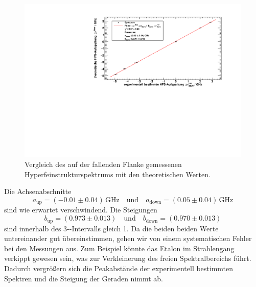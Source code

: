 \begin{figure}[H]
\begin{center}
    \includegraphics[width=\textwidth]{../img/part2/down-spectrum.pdf}
    \caption{Vergleich des auf der fallenden Flanke gemessenen Hyperfeinstrukturspektrums mit den theoretischen Werten.}
    \label{img:hfs:spectrum:down}
\end{center}
\end{figure}
Die Achsenabschnitte 
\begin{equation}
    a_\text{up} = (-0.01 \pm 0.04)\,\text{GHz} \quad \text{und} \quad a_\text{down} = (0.05 \pm 0.04)\,\text{GHz}
\end{equation}
sind wie erwartet verschwindend.
Die Steigungen
\begin{equation}
    b_\text{up} = (0.973 \pm 0.013) \quad \text{und} \quad b_\text{down} = (0.970 \pm 0.013)
\end{equation}
sind innerhalb des 3-\textsigma-Intervalls gleich 1. Da die beiden beiden Werte untereinander gut übereinstimmen, gehen wir von einem systematischen 
Fehler bei den Messungen aus. Zum Beispiel könnte das Etalon im Strahlengang verkippt gewesen sein, was zur Verkleinerung des freien Spektralbereichs führt. 
Dadurch vergrößern sich die Peakabstände der experimentell bestimmten Spektren und die Steigung der Geraden nimmt ab.

